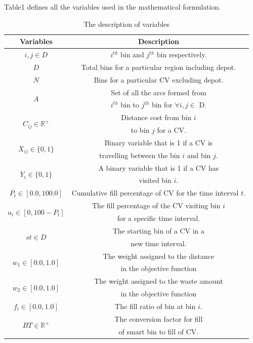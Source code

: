 \documentclass[12pt]{article}
\begin{document}
Table1 defines all the variables used in the mathematical formulation.
\begin{table}[H]\label{variables}
	\centering
	\caption{The description of variables}
	\begin{tabular}{|c|c|}
        \hline 
        \rowcolor{Gray1}\hspace{40pt} \textbf{Variables} \hspace{40pt} & \hspace{130pt} \textbf{Description} \hspace{130pt} \\
		\hline $i, j \in D$ & $i^{th}$ bin and $j^{th}$ bin respectively.\\
		\hline $D$ & Total bins for a particular region including depot.\\
		\hline $N$ & Bins for a particular CV excluding depot.\\
		\hline \multirow{2}{*}{$A$} & Set of all the arcs formed from \\
		&  $i^{th}$ bin to $j^{th}$ bin for $\forall i ,j \in$ D.\\
		\hline \multirow{2}{*}{$C_{ij}\in \mathbb{R}^+$} & Distance cost from bin $i$\\
		& to bin $j$ for a CV.\\
		\hline \multirow{2}{*}{$X_{ij} \in \{0, 1\}$} & Binary variable that is 1 if a CV is\\
		& travelling between the bin $i$ and bin $j$.\\  
		\hline \multirow{2}{*}{$Y_{i} \in \{0, 1\}$} & A binary variable that is 1 if a CV has \\
		& visited bin $i$.\\
		\hline \multirow{1}{*}{$P_{t} \in [0.0, 100.0]$} & Cumulative fill percentage of CV for the time interval $t$.\\
		\hline \multirow{2}{*}{$u_{i}  \in [0, 100 -P_{t}] $} & The fill percentage of the CV visiting bin $i$ \\
		& for a specific time interval.\\
		\hline \multirow{2}{*}{$st \in D$} & The starting bin of a CV in a\\
		& new time interval.\\
		\hline \multirow{2}{*}{$w_{1} \in [0.0, 1.0]$} & The weight assigned to the distance \\
		& in the objective function\\
		\hline \multirow{2}{*}{$w_{2} \in [0.0, 1.0]$} & The weight assigned to the waste amount \\
		& in the objective function\\
		\hline \multirow{1}{*}{$f_{i} \in [0.0, 1.0]$} & The fill ratio of bin at bin $i$.\\
		\hline \multirow{2}{*}{$BT \in \mathbb{R}^+$} & The conversion factor for fill \\
		& of smart bin to fill of CV.\\
		
		\hline
    \end{tabular}
\end{table} 
\end{document}
